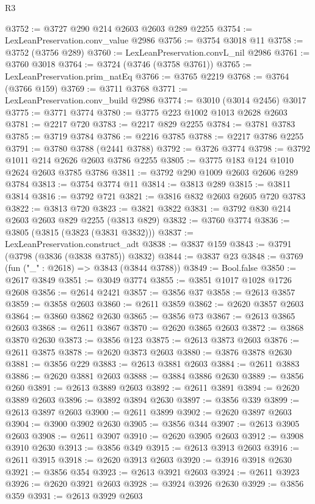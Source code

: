 \begin{lexlean}{R3}
\begin{coremodule}
@3752 := @3727 @290 @214 @2603 @2603 @289 @2255
@3754 := LexLeanPreservation.conv_value @2986
@3756 := @3754 @3018 @11
@3758 := @3752 (@3756 @289)
@3760 := LexLeanPreservation.convL_nil @2986
@3761 := @3760 @3018
@3764 := @3724 (@3746 (@3758 @3761))
@3765 := LexLeanPreservation.prim_natEq
@3766 := @3765 @2219
@3768 := @3764 (@3766 @159)
@3769 := @3711 @3768
@3771 := LexLeanPreservation.conv_build @2986
@3774 := @3010 (@3014 @2456) @3017
@3775 := @3771 @3774
@3780 := @3775 @223 @1002 @1013 @2628 @2603
@3781 := @2217 @720
@3783 := @2217 @829 @2255
@3784 := @3781 @3783
@3785 := @3719 @3784
@3786 := @2216 @3785
@3788 := @2217 @3786 @2255
@3791 := @3780 @3788 (@2441 @3788)
@3792 := @3726 @3774
@3798 := @3792 @1011 @214 @2626 @2603 @3786 @2255
@3805 := @3775 @183 @124 @1010 @2624 @2603 @3785 @3786
@3811 := @3792 @290 @1009 @2603 @2606 @289 @3784
@3813 := @3754 @3774 @11
@3814 := @3813 @289
@3815 := @3811 @3814
@3816 := @3792 @721
@3821 := @3816 @832 @2603 @2605 @720 @3783
@3822 := @3813 @720
@3823 := @3821 @3822
@3831 := @3792 @830 @214 @2603 @2603 @829 @2255 (@3813 @829)
@3832 := @3760 @3774
@3836 := @3805 (@3815 (@3823 (@3831 @3832)))
@3837 := LexLeanPreservation.construct_adt
@3838 := @3837 @159
@3843 := @3791 (@3798 (@3836 (@3838 @3785)) @3832)
@3844 := @3837 @23
@3848 := @3769 (fun ("_" : @2618) => @3843 (@3844 @3788))
@3849 := Bool.false
@3850 := @2617 @3849
@3851 := @3049 @3774
@3855 := @3851 @1017 @1028 @1726 @2608
@3856 := @2614 @2421
@3857 := @3856 @37
@3858 := @2613 @3857
@3859 := @3858 @2603
@3860 := @2611 @3859
@3862 := @2620 @3857 @2603
@3864 := @3860 @3862 @2630
@3865 := @3856 @73
@3867 := @2613 @3865 @2603
@3868 := @2611 @3867
@3870 := @2620 @3865 @2603
@3872 := @3868 @3870 @2630
@3873 := @3856 @123
@3875 := @2613 @3873 @2603
@3876 := @2611 @3875
@3878 := @2620 @3873 @2603
@3880 := @3876 @3878 @2630
@3881 := @3856 @229
@3883 := @2613 @3881 @2603
@3884 := @2611 @3883
@3886 := @2620 @3881 @2603
@3888 := @3884 @3886 @2630
@3889 := @3856 @260
@3891 := @2613 @3889 @2603
@3892 := @2611 @3891
@3894 := @2620 @3889 @2603
@3896 := @3892 @3894 @2630
@3897 := @3856 @339
@3899 := @2613 @3897 @2603
@3900 := @2611 @3899
@3902 := @2620 @3897 @2603
@3904 := @3900 @3902 @2630
@3905 := @3856 @344
@3907 := @2613 @3905 @2603
@3908 := @2611 @3907
@3910 := @2620 @3905 @2603
@3912 := @3908 @3910 @2630
@3913 := @3856 @349
@3915 := @2613 @3913 @2603
@3916 := @2611 @3915
@3918 := @2620 @3913 @2603
@3920 := @3916 @3918 @2630
@3921 := @3856 @354
@3923 := @2613 @3921 @2603
@3924 := @2611 @3923
@3926 := @2620 @3921 @2603
@3928 := @3924 @3926 @2630
@3929 := @3856 @359
@3931 := @2613 @3929 @2603

\end{coremodule}
\end{lexlean}
